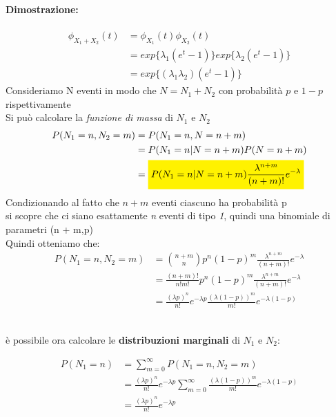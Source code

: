 \documentclass[]{article}
\newcommand{\highlight}[1]{\colorbox{yellow}{$\displaystyle #1$}}
\begin{document}
    \paragraph{Dimostrazione:}
    \begin{equation*}
        \begin{split}
            \phi_{X_1 + X_2} (t) & = \phi_{X_1}(t) \phi_{X_2}(t) \\
            & = exp\{\lambda_1 (e^t - 1)\} exp\{\lambda_2 (e^t - 1)\} \\
            & = exp\{(\lambda_1 \lambda_2) (e^t - 1)\}
        \end{split}
    \end{equation*}
    Consideriamo N eventi in modo che $N = N_1 + N_2$ con probabilità $p$ e $1 - p$ rispettivamente \\
    Si può calcolare la \textit{funzione di massa} di $N_1$ e $N_2$
    \begin{equation*}
        \begin{split}
            P(N_1 = n, N_2 = m) &= P(N_1 = n, N = n+m) \\
            & = P(N_1 = n | N = n + m) P(N = n+m) \\
            & = \highlight{P(N_1 = n | N = n + m) \frac{\lambda^{n+m}}{(n+m)!} e^{-\lambda}}
        \end{split}
    \end{equation*}
    Condizionando al fatto che $n + m$ eventi ciascuno ha probabilità p \\
    si scopre che ci siano esattamente \textit{n} eventi di tipo \textit{1}, quindi una binomiale di parametri (n + m,p) \\
    Quindi otteniamo che:
    \begin{equation*}
        \begin{split}
            P(N_1 = n, N_2 = m) &= \binom{n + m}{n} p^n (1-p)^m \frac{\lambda^{n+m}}{(n+m)!} e^{-\lambda} \\
            & = \frac{(n+m)!}{n! m!} p^n (1-p)^m \frac{\lambda^{n+m}}{(n+m)!} e^{-\lambda} \\
            & = \frac{(\lambda p)^n}{n!} e^{-\lambda p} \frac{(\lambda (1-p))^m}{m!} e^{-\lambda (1-p)}
        \end{split}
    \end{equation*} \\
    \centerline{è possibile ora calcolare le \textbf{distribuzioni marginali} di $N_1$ e $N_2$:}
    \begin{equation*}
        \begin{split}
            P(N_1 = n) &= \sum_{m = 0}^{\infty} P(N_1 = n, N_2 = m) \\
            & = \frac{(\lambda p)^n}{n!} e^{-\lambda p} \sum_{m = 0}^{\infty} \frac{(\lambda (1 - p))^m}{m!} e^{-\lambda(1-p)} \\
            & = \frac{(\lambda p)^n}{n!} e^{-\lambda p}
        \end{split}
    \end{equation*}
\end{document}
